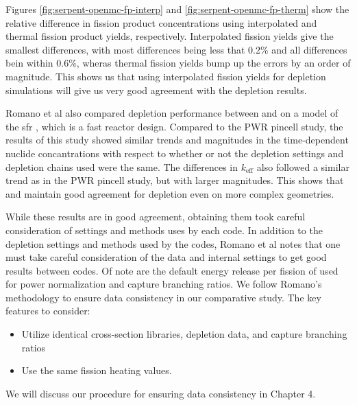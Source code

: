 Figures \ref{fig:serpent-openmc-fp-interp} and
\ref{fig:serpent-openmc-fp-therm} show the relative difference in fission
product concentrations using interpolated and thermal fission product yields,
respectively. Interpolated fission yields give the smallest differences, with
most differences being less that 0.2\% and all differences bein within 0.6\%,
wheras thermal fission yields bump up the errors by an order of magnitude. This
shows us that using interpolated fission yields for \OpenMC depletion
simulations will give us very good agreement with the \SerpentTWO depletion
results.

Romano et al also compared depletion performance between \OpenMC and
\SerpentTWO on a model of the \Gls{sfr} \cite{oecd_benchmark_2016}, which is a
fast reactor design. Compared to the PWR pincell study, the results of this
study showed similar trends and magnitudes in the time-dependent nuclide
concantrations with respect to whether or not the depletion settings and
depletion chains used were the same. The differences in $k_\text{eff}$ also
followed a similar trend as in the PWR pincell study, but with larger
magnitudes. This shows that \OpenMC and \SerpentTWO maintain good agreement for
depletion even on more complex geometries.

While these results are in good agreement, obtaining them took careful
consideration of settings and methods uses by each code. In addition to the
depletion settings and methods used by the codes,  Romano et al notes that one
must take careful consideration of the data and internal settings to get good
results between codes. Of note are the default energy release per fission of
 used for power normalization and capture branching ratios. We
follow Romano's methodology to ensure data consistency in our comparative
study. The key features to consider:
\begin{itemize}
    \item Utilize identical cross-section libraries, depletion data, and capture branching ratios
    \item Use the same fission heating values.
\end{itemize}
We will discuss our procedure for ensuring data consistency in Chapter 4.
